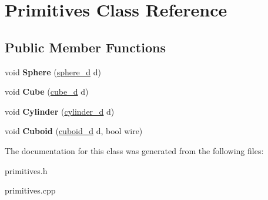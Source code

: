 \hypertarget{class_primitives}{}\section{Primitives Class Reference}
\label{class_primitives}
\subsection*{Public Member Functions}
\begin{DoxyCompactItemize}
\item 
void {\bfseries Sphere} (\hyperlink{structsphere__d}{sphere\+\_\+d} d)\hypertarget{class_primitives_a50a7b4889256e7a5f4212a19d5843fc4}{}\label{class_primitives_a50a7b4889256e7a5f4212a19d5843fc4}

\item 
void {\bfseries Cube} (\hyperlink{structcube__d}{cube\+\_\+d} d)\hypertarget{class_primitives_a12c487b0a66e0111fd10bc43a5a70f08}{}\label{class_primitives_a12c487b0a66e0111fd10bc43a5a70f08}

\item 
void {\bfseries Cylinder} (\hyperlink{structcylinder__d}{cylinder\+\_\+d} d)\hypertarget{class_primitives_aa517aef8b223b535e6b028c8427681db}{}\label{class_primitives_aa517aef8b223b535e6b028c8427681db}

\item 
void {\bfseries Cuboid} (\hyperlink{structcuboid__d}{cuboid\+\_\+d} d, bool wire)\hypertarget{class_primitives_abac3469cf815590a9dff21395cf5082f}{}\label{class_primitives_abac3469cf815590a9dff21395cf5082f}

\end{DoxyCompactItemize}


The documentation for this class was generated from the following files\+:\begin{DoxyCompactItemize}
\item 
primitives.\+h\item 
primitives.\+cpp\end{DoxyCompactItemize}
